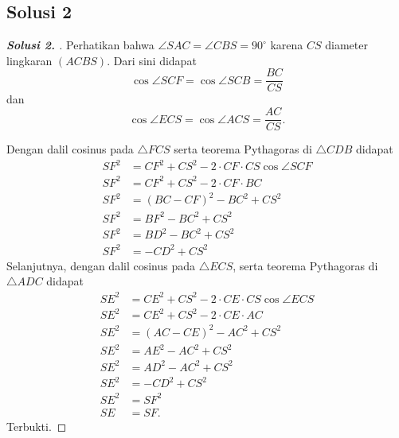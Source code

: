 \documentclass[12pt]{scrartcl}
\begin{document}
\subsection{Solusi 2}
\begin{proof}[\textbf{Solusi 2. }] 
Perhatikan bahwa $\angle SAC = \angle CBS = 90^\circ$ karena $CS$ diameter lingkaran $(ACBS)$. Dari sini didapat 
$$\cos \angle SCF = \cos \angle SCB = \frac{BC}{CS}$$ 
dan 
$$\cos \angle ECS = \cos \angle ACS = \frac{AC}{CS}.$$

Dengan dalil cosinus pada $\triangle FCS$ serta teorema Pythagoras di $\triangle CDB$ didapat
\begin{align*}
    SF^2 &= CF^2 + CS^2 - 2\cdot CF \cdot CS \cos \angle SCF\\
    SF^2 &= CF^2 + CS^2 - 2\cdot CF \cdot BC\\
    SF^2 &= (BC-CF)^2 - BC^2 + CS^2\\
    SF^2 &= BF^2 - BC^2 + CS^2\\
    SF^2 &= BD^2 - BC^2 + CS^2\\
    SF^2 &= -CD^2 + CS^2
\end{align*}
Selanjutnya, dengan dalil cosinus pada $\triangle ECS$, serta teorema Pythagoras di $\triangle ADC$ didapat
\begin{align*}
    SE^2 &= CE^2 + CS^2 - 2\cdot CE \cdot CS \cos \angle ECS \\
    SE^2 &= CE^2 + CS^2 - 2\cdot CE \cdot AC\\
    SE^2 &= (AC-CE)^2 - AC^2 + CS^2\\
    SE^2 &= AE^2 - AC^2 + CS^2\\
    SE^2 &= AD^2 - AC^2 + CS^2\\
    SE^2 &= -CD^2 + CS^2\\
    SE^2 &= SF^2\\
    SE &= SF.
\end{align*}
Terbukti.
\end{proof}
\end{document}
